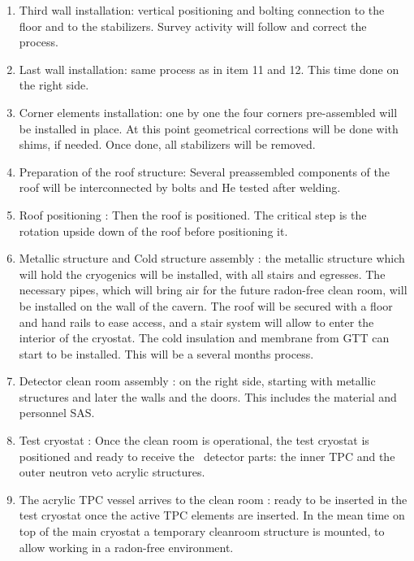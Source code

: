 \begin{enumerate}
\item Third wall installation: vertical positioning and bolting connection to the floor and to the stabilizers. Survey activity will follow and correct the process.
  
\item Last wall installation: same process as in item 11 and 12. This time done on the right side.

\item Corner elements installation: one by one the four corners pre-assembled will be installed in place. At this point geometrical corrections will be done with shims, if needed. Once done, all stabilizers will be removed.

\item Preparation of the roof structure: Several preassembled components of the roof will be interconnected by bolts and He tested after welding.
 
\item Roof positioning : Then the roof is positioned. The critical step is the rotation upside down of the roof before positioning it.
 
\item Metallic structure and Cold structure assembly : the metallic structure which will hold the cryogenics will be installed, with all stairs and egresses. The necessary pipes, which will bring air for the future radon-free clean room, will be installed on the wall of the cavern. The roof will be secured with a floor and hand rails to ease access, and a stair system will allow to enter the interior of the cryostat. The cold insulation and membrane from GTT can start to be installed. This will be a several months process.
 
\item Detector clean room assembly : on the right side, starting with metallic structures and later the walls and the doors. This includes the material and personnel SAS.
 
\item Test cryostat : Once the clean room is operational, the test cryostat is positioned and ready to receive the \DSks\ detector parts: the inner TPC and the outer neutron veto acrylic structures.
 
\item The acrylic TPC vessel arrives to the clean room : ready to be inserted in the test cryostat once the active TPC elements are inserted. In the mean time on top of the main cryostat a temporary cleanroom structure is mounted, to allow working in a radon-free environment.
 

\end{enumerate}
